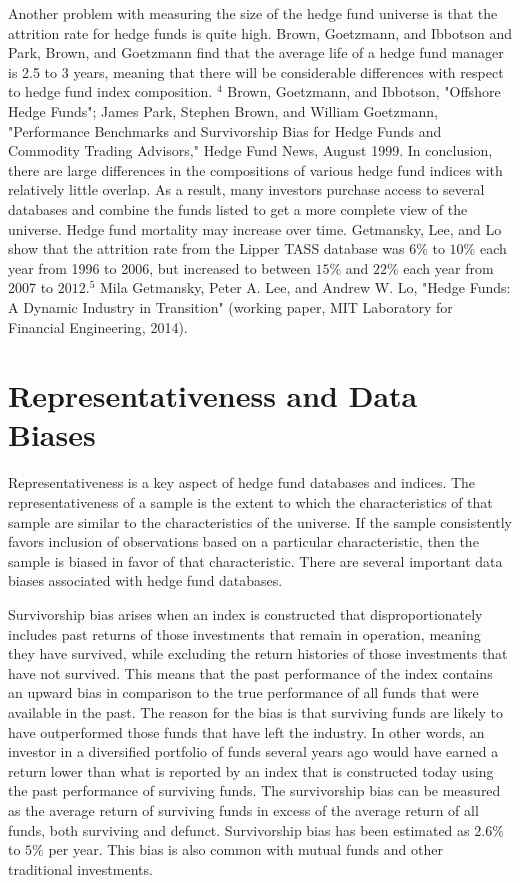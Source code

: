 \documentclass[11pt]{article}
\begin{document}
Another problem with measuring the size of the hedge fund universe is that the attrition rate for hedge funds is quite high. Brown, Goetzmann, and Ibbotson and Park, Brown, and Goetzmann find that the average life of a hedge fund manager is 2.5 to 3 years, meaning that there will be considerable differences with respect to hedge fund index composition. ${ }^{4}$ Brown, Goetzmann, and Ibbotson, "Offshore Hedge Funds"; James Park, Stephen Brown, and William Goetzmann, "Performance Benchmarks and Survivorship Bias for Hedge Funds and Commodity Trading Advisors," Hedge Fund News, August 1999. In conclusion, there are large differences in the compositions of various hedge fund indices with relatively little overlap. As a result, many investors purchase access to several databases and combine the funds listed to get a more complete view of the universe. Hedge fund mortality may increase over time. Getmansky, Lee, and Lo show that the attrition rate from the Lipper TASS database was $6 \%$ to $10 \%$ each year from 1996 to 2006, but increased to between $15 \%$ and $22 \%$ each year from 2007 to $2012 .{ }^{5}$ Mila Getmansky, Peter A. Lee, and Andrew W. Lo, "Hedge Funds: A Dynamic Industry in Transition" (working paper, MIT Laboratory for Financial Engineering, 2014).

\section*{Representativeness and Data Biases}
Representativeness is a key aspect of hedge fund databases and indices. The representativeness of a sample is the extent to which the characteristics of that sample are similar to the characteristics of the universe. If the sample consistently favors inclusion of observations based on a particular characteristic, then the sample is biased in favor of that characteristic. There are several important data biases associated with hedge fund databases.

Survivorship bias arises when an index is constructed that disproportionately includes past returns of those investments that remain in operation, meaning they have survived, while excluding the return histories of those investments that have not survived. This means that the past performance of the index contains an upward bias in comparison to the true performance of all funds that were available in the past. The reason for the bias is that surviving funds are likely to have outperformed those funds that have left the industry. In other words, an investor in a diversified portfolio of funds several years ago would have earned a return lower than what is reported by an index that is constructed today using the past performance of surviving funds. The survivorship bias can be measured as the average return of surviving funds in excess of the average return of all funds, both surviving and defunct. Survivorship bias has been estimated as $2.6 \%$ to $5 \%$ per year. This bias is also common with mutual funds and other traditional investments.
\end{document}
